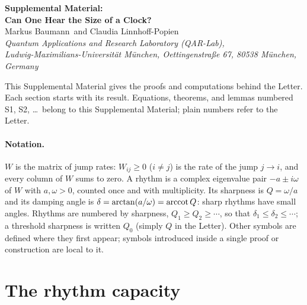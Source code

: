 \clearpage
\onecolumngrid
\setcounter{page}{1}
\renewcommand{\thepage}{S\arabic{page}}
\setcounter{equation}{0}
\renewcommand{\theequation}{S\arabic{equation}}
\setcounter{section}{0}
\setcounter{secnumdepth}{3}
\setcounter{theorem}{0}
\setcounter{lemma}{0}
\setcounter{corollary}{0}

\begin{center}
{\large\bfseries Supplemental Material:\\[1pt] Can One Hear the Size of a Clock?}\\[10pt]
Markus Baumann\, and Claudia Linnhoff-Popien\,\\[3pt]
{\small\itshape Quantum Applications and Research Laboratory (QAR-Lab),\\ Ludwig-Maximilians-Universit\"at M\"unchen, Oettingenstra{\ss}e 67, 80538 M\"unchen, Germany}
\end{center}

\medskip
This Supplemental Material gives the proofs and computations behind the Letter. Each section starts with its result. Equations, theorems, and lemmas numbered S1, S2, \dots\ belong to this Supplemental Material; plain numbers refer to the Letter.

\paragraph*{Notation.} $W$ is the matrix of jump rates: $W_{ij}\ge0$ ($i\ne j$) is the rate of the jump $j\to i$, and every column of $W$ sums to zero. A rhythm is a complex eigenvalue pair $-a\pm i\omega$ of $W$ with $a,\omega>0$, counted once and with multiplicity. Its sharpness is $Q=\omega/a$ and its damping angle is $\delta=\arctan(a/\omega)=\operatorname{arccot} Q$: sharp rhythms have small angles. Rhythms are numbered by sharpness, $Q_1\ge Q_2\ge\cdots$, so that $\delta_1\le\delta_2\le\cdots$; a threshold sharpness is written $Q_0$ (simply $Q$ in the Letter). Other symbols are defined where they first appear; symbols introduced inside a single proof or construction are local to it.

\tableofcontents

\section{The rhythm capacity}\label{sec:counting}

